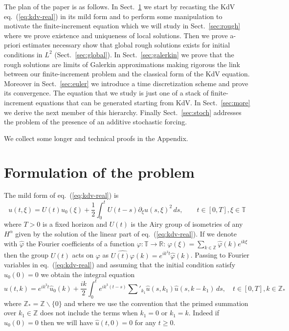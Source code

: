 \documentclass[a4paper,12pt,reqno]{article}
\newcommand{\RR}{\mathbb{R}}
\newcommand{\TT}{\mathbb{T}}
\newcommand{\ZZ}{\mathbb{Z}}
\newcommand{\wh}{\widehat}
\begin{document}
\bigskip
The plan of the paper is as follows. In Sect.~\ref{sec:intro} we start by recasting the KdV
eq.~(\ref{eq:kdv-real}) in its mild form and to perform some
manipulation to motivate the finite-increment equation which we will study
in Sect.~\ref{sec:rough}  where we prove  existence and uniqueness of
local solutions. Then we prove a-priori estimates necessary
show that global rough solutions
exists for initial conditions in $L^2$ (Sect.~\ref{sec:global}).
In
Sect.~\ref{sec:galerkin} we  prove that the rough solutions are
limits of Galerkin approximations making rigorous the link between our
finite-increment problem and the classical form of the KdV
equation. Moreover in Sect.~\ref{sec:euler} we introduce a
time discretization scheme and prove its convergence.
 The
equation that we study is just one of a stack of finite-increment equations that can be
generated starting from KdV. In Sect.~\ref{sec:more} we derive the
next member of this hierarchy. Finally
Sect.~\ref{sec:stoch} addresses the problem of the presence of an
additive stochastic forcing.

We collect some longer and technical proofs in the Appendix.

\bigskip

\section{Formulation of the problem}
\label{sec:intro}
The mild form of eq.~(\ref{eq:kdv-real})  is
\begin{equation}
\label{eq:kdv-mild}
u(t,\xi) = U(t) u_0(\xi) + \frac{1}{2} \int_0^t U(t-s) \partial_\xi
u(s,\xi)^2\, ds ,\qquad t \in[0,T], \xi \in \TT  
\end{equation}
where $T>0$ is a fixed horizon and  $U(t)$ is the Airy group of isometries of any $H^\alpha$ given by the
solution of the linear part of eq.~(\ref{eq:kdv-real}). If we denote with
$\wh \varphi$ the Fourier coefficients of a function $\varphi : \TT \to
\RR$:
$
\varphi(\xi) = \sum_{k \in \ZZ} \wh \varphi(k) e^{i k \xi}
$
then the group $U(t)$ acts on $\varphi$ as
$
\wh{U(t) \varphi}(k) = e^{i k^3 t} \wh \varphi(k)
$.
Passing to Fourier variables in eq.~(\ref{eq:kdv-real}) and assuming
that the initial condition satisfy $\wh u_0(0) = 0$ we obtain the
integral equation
\begin{equation}
  \label{eq:kdv-spectral}
\wh u(t,k) = e^{i k^3 t} \wh u_0(k) + \frac{ik}2 \int_0^t e^{i k^3 (t-s)}
\sum'_{k_1} \wh u(s,k_1) \wh u(s,k-k_1) \, ds, \quad t \in [0,T], k \in \ZZ_* 
\end{equation}
where $\ZZ_* = \ZZ \backslash \{ 0 \} $ and where we use the
convention that the primed summation over $k_1 \in \ZZ$ does not include the
terms when $k_1 = 0$ or $k_1 = k$. Indeed  if
$\wh u_0(0) = 0$ then we will have $\wh u(t,0) = 0$ for any $t \ge 0$.
\end{document}
